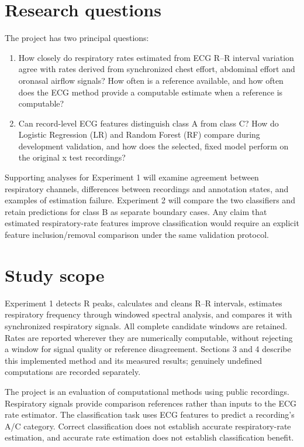 \section{Research questions}
The project has two principal questions:
\begin{enumerate}
\item How closely do respiratory rates estimated from ECG R--R interval variation agree with rates derived from synchronized chest effort, abdominal effort and oronasal airflow signals? How often is a reference available, and how often does the ECG method provide a computable estimate when a reference is computable?
\item Can record-level ECG features distinguish class A from class C? How do Logistic Regression (LR) and Random Forest (RF) compare during development validation, and how does the selected, fixed model perform on the original x test recordings?
\end{enumerate}
Supporting analyses for Experiment 1 will examine agreement between respiratory channels, differences between recordings and annotation states, and examples of estimation failure. Experiment 2 will compare the two classifiers and retain predictions for class B as separate boundary cases. Any claim that estimated respiratory-rate features improve classification would require an explicit feature inclusion/removal comparison under the same validation protocol.

\section{Study scope}
Experiment 1 detects R peaks, calculates and cleans R--R intervals, estimates respiratory frequency through windowed spectral analysis, and compares it with synchronized respiratory signals. All complete candidate windows are retained. Rates are reported wherever they are numerically computable, without rejecting a window for signal quality or reference disagreement. Sections 3 and 4 describe this implemented method and its measured results; genuinely undefined computations are recorded separately.

The project is an evaluation of computational methods using public recordings. Respiratory signals provide comparison references rather than inputs to the ECG rate estimator. The classification task uses ECG features to predict a recording's A/C category. Correct classification does not establish accurate respiratory-rate estimation, and accurate rate estimation does not establish classification benefit.

